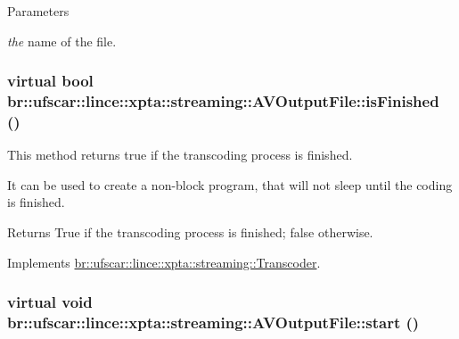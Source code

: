 \begin{DoxyParams}{Parameters}
\item[{\em the}]name of the file. \end{DoxyParams}
\hypertarget{classbr_1_1ufscar_1_1lince_1_1xpta_1_1streaming_1_1AVOutputFile_ad25c8530fc11ca328e5390fb70c4da08}{
\subsubsection[{isFinished}]{\setlength{\rightskip}{0pt plus 5cm}virtual bool br::ufscar::lince::xpta::streaming::AVOutputFile::isFinished ()}}
\label{classbr_1_1ufscar_1_1lince_1_1xpta_1_1streaming_1_1AVOutputFile_ad25c8530fc11ca328e5390fb70c4da08}


This method returns true if the transcoding process is finished. 

It can be used to create a non-\/block program, that will not sleep until the coding is finished. \begin{DoxyReturn}{Returns}
True if the transcoding process is finished; false otherwise. 
\end{DoxyReturn}


Implements \hyperlink{classbr_1_1ufscar_1_1lince_1_1xpta_1_1streaming_1_1Transcoder_aceabe1e9bb931313d5a52a53b9ab4af6}{br::ufscar::lince::xpta::streaming::Transcoder}.

\hypertarget{classbr_1_1ufscar_1_1lince_1_1xpta_1_1streaming_1_1AVOutputFile_a12bd9f754bbd73bb8bba3f8176f3d712}{
\subsubsection[{start}]{\setlength{\rightskip}{0pt plus 5cm}virtual void br::ufscar::lince::xpta::streaming::AVOutputFile::start ()}}
\label{classbr_1_1ufscar_1_1lince_1_1xpta_1_1streaming_1_1AVOutputFile_a12bd9f754bbd73bb8bba3f8176f3d712}


